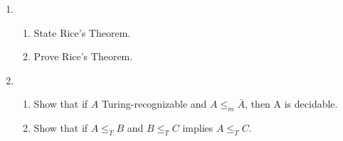 \documentclass[11pt]{article}
\begin{document}
\begin{enumerate}
\begin{enumerate}
\end{enumerate} 
\item 
\begin{enumerate}
	\item State Rice's Theorem.
	\item Prove Rice's Theorem.
\end{enumerate}

\item 
\begin{enumerate}
		
	\item Show that if $A$ Turing-recognizable and $A \leq_m \bar{A}$, then A is decidable.
	\item Show that if $A\leq_T B$ and $B\leq_T C$ implies $A\leq_T C$.
\end{enumerate}

\end{enumerate}
\end{document}
